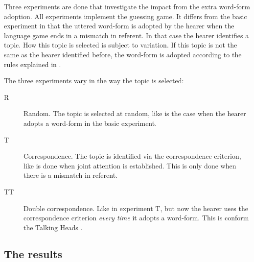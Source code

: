 Three experiments are done that investigate the impact from the extra word-form adoption. All experiments implement the guessing game. It differs from the basic experiment in that the uttered word-form is adopted by the hearer when the language game ends in a mismatch in referent. In that case the hearer identifies a topic. How this topic is selected is subject to variation. If this topic is not the same as the hearer identified before, the word-form is adopted according to the rules explained in .

The three experiments vary in the way the topic is selected:

\begin{description}
\item[R] Random. The topic is selected at random, like is the case when the hearer adopts a word-form in the basic experiment.

\item[T] Correspondence. The topic is identified via the correspondence criterion, like is done when joint attention is established. This is only done when there is a mismatch in referent.

\item[TT] Double correspondence. Like in experiment T, but now the hearer uses the correspondence criterion {\em every time} it adopts a word-form. This is conform the Talking Heads \citep{steels:2000}.
\end{description}

\subsection{The results}


